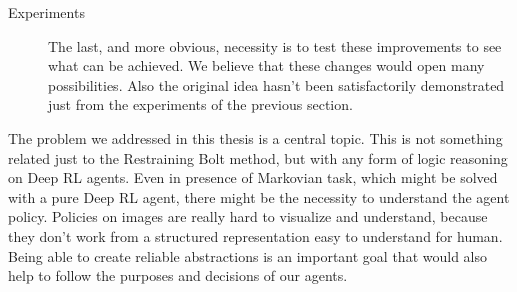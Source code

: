 \begin{description}
	\item [Experiments] The last, and more obvious, necessity is to test 
		these improvements to see what can be achieved. We believe that these
		changes would open many possibilities. Also the original idea hasn't been
		satisfactorily demonstrated just from the experiments of the previous
		section.
\end{description}

The problem we addressed in this thesis is a central topic. This is not
something related just to the Restraining Bolt method, but with any form of
logic reasoning on Deep RL agents. Even in presence of Markovian task, which
might be solved with a pure Deep RL agent, there might be the necessity to
understand the agent policy. Policies on images are really hard to visualize
and understand, because they don't work from a structured representation easy
to understand for human. Being able to create reliable abstractions is an
important goal that would also help to follow the purposes and decisions of
our agents.
